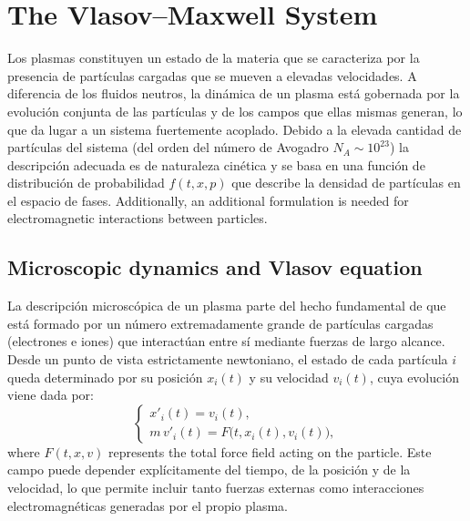 \documentclass[11pt,a4paper,twoside,pdf]{article}
\numberwithin{equation}{section}
\begin{document}
\newpage

\section{The Vlasov--Maxwell System}

Los plasmas constituyen un estado de la materia que se caracteriza por la
presencia de partículas cargadas que se mueven a elevadas velocidades.
A diferencia de los fluidos neutros, la dinámica de un plasma está gobernada por la
evolución conjunta de las partículas y de los campos que ellas mismas generan, lo que
da lugar a un sistema fuertemente acoplado. Debido a la elevada cantidad de partículas del sistema (del orden del número de Avogadro $N_A \sim 10^{23}$) la descripción adecuada es de naturaleza cinética y se basa en una
función de distribución de probabilidad $f(t,x,p)$ que describe la densidad de partículas en el espacio
de fases. Additionally, an additional formulation is needed for electromagnetic interactions between particles.










\subsection{Microscopic dynamics and Vlasov equation}

La descripción microscópica de un plasma parte del hecho fundamental de que está
formado por un número extremadamente grande de partículas cargadas (electrones e
iones) que interactúan entre sí mediante fuerzas de largo alcance. Desde un punto
de vista estrictamente newtoniano, el estado de cada partícula $i$ queda determinado
por su posición $x_i(t)$ y su velocidad $v_i(t)$, cuya evolución viene dada por:
\begin{equation}
\begin{cases}
x'_i(t) = v_i(t), \\[0.3em]
m\, v'_i(t) = F\big(t,x_i(t),v_i(t)\big),
\end{cases}
\label{eq:newton_micro}
\end{equation}
where $F(t,x,v)$ represents the total force field acting on the particle.
Este campo puede depender explícitamente del tiempo, de la posición y de la
velocidad, lo que permite incluir tanto fuerzas externas como interacciones
electromagnéticas generadas por el propio plasma.
\end{document}
